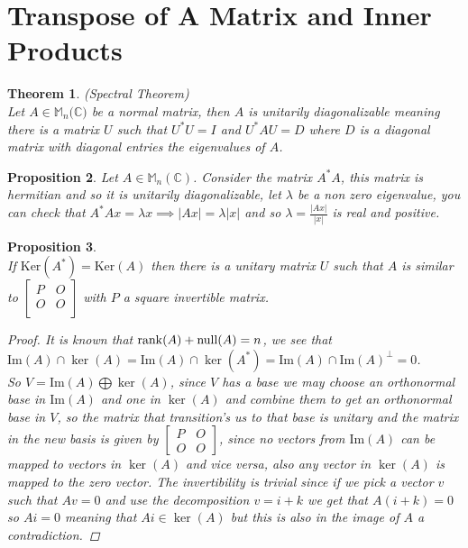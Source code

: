 \documentclass[12pt]{article}
\newcommand{\Null}{\mathrm{null}}
\newtheorem{theorem}{Theorem}[section]
\newtheorem{prop}[theorem]{Proposition}
\theoremstyle{definition}
\theoremstyle{remark}
\theoremstyle{plain}
\begin{document}
\section{Transpose of A Matrix and Inner Products}
\begin{theorem}\textup{(Spectral Theorem)}\\ 
Let $A\in\mathbb{M}_n(\mathbb{C)}$ be a normal matrix, then $A$ is unitarily diagonalizable meaning there is a matrix $U$ such that $U^*U=I$ and $U^*AU=D$ where $D$ is a diagonal matrix with diagonal entries the eigenvalues of $A$.
\end{theorem}
\begin{prop}
    Let $A\in \mathbb{M}_n(\mathbb{C})$. Consider the matrix $A^*A$, this matrix is hermitian and so it is unitarily diagonalizable, let $\lambda$ be a non zero eigenvalue, you can check that $A^*Ax=\lambda x\implies |Ax|=\lambda |x|$ and so $\lambda = \frac{|Ax|}{|x|}$ is real and positive.
\end{prop}

\begin{prop}\leavevmode \\
If $\mathrm{Ker}(A^*)=\mathrm{Ker}(A)$ then there is a unitary matrix  $U$ such that $A$ is similar to $\begin{bmatrix}
    P & O\\
    O & O \\
\end{bmatrix}$ with $P$ a square invertible matrix.
\begin{proof}
    It is known that $\rank(A)+\Null(A)=n$, we see that $\mathrm{Im}(A)\cap \ker(A)=\mathrm{Im}(A)\cap \ker(A^*)=\mathrm{Im}(A)\cap \mathrm{Im}(A)^\perp=0$.\\
    So $V=\mathrm{Im}(A) \bigoplus \ker(A)$, since $V$ has a base we may choose an orthonormal base in $\mathrm{Im}(A)$ and one in $\ker(A)$ and combine them to get an orthonormal base in $V$, so the matrix that transition's us to that base is unitary and the matrix in the new basis is given by $\begin{bmatrix}
        P & O \\
        O & O
    \end{bmatrix}$, since no vectors from $\mathrm{Im}(A)$ can be mapped to vectors in $\ker(A)$ and vice versa, also any vector in $\ker(A)$ is mapped to the zero vector. The invertibility is trivial since if we pick a vector $v$ such that $Av=0$ and use the decomposition $v=i+k$ we get that $A(i+k)=0$ so $Ai=0$ meaning that $Ai\in \ker(A)$ but this is also in the image of $A$ a contradiction.
\end{proof}
\end{prop}
\end{document}
